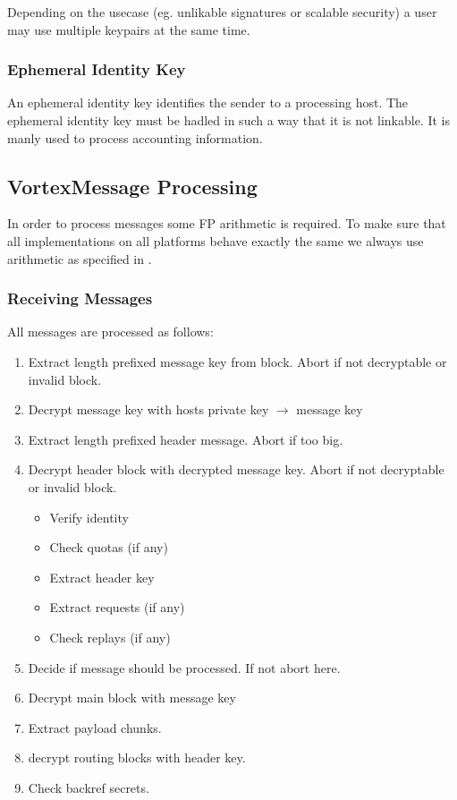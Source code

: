Depending on the usecase (eg. unlikable signatures or scalable security) a user may use multiple keypairs at the same time.

\subsubsection{Ephemeral Identity Key}
An ephemeral identity key identifies the sender to a processing host. The ephemeral identity key must be hadled in such a way that it is not linkable. It is manly used to process accounting information.

\subsection{VortexMessage Processing}
In order to process messages some FP arithmetic is required. To make sure that all implementations on all platforms behave exactly the same we always use arithmetic as specified in \cite{IEEE754}.

\subsubsection{Receiving Messages}
All messages are processed as follows:
\begin{enumerate}
	\item Extract length prefixed message key from block. Abort if not decryptable or invalid block.
	\item Decrypt message key with hosts private key $\rightarrow$ message key
	\item Extract length prefixed header message. Abort if too big.
	\item Decrypt header block with decrypted message key. Abort if not decryptable or invalid block.
	\begin{itemize}
		\item Verify identity
		\item Check quotas (if any)
		\item Extract header key
		\item Extract requests (if any)
		\item Check replays (if any)
	\end{itemize}
	\item Decide if message should be processed. If not abort here.
	\item Decrypt main block with message key
	\item Extract payload chunks.
	\item decrypt routing blocks with header key.
	\item Check backref secrets.
\end{enumerate}


